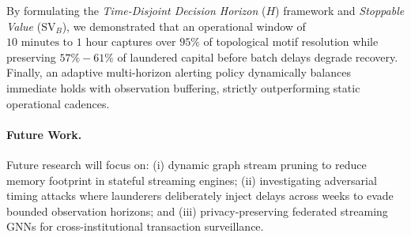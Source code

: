 \documentclass[pdflatex,sn-mathphys,Numbered]{sn-jnl}
\theoremstyle{thmstyleone}
\theoremstyle{thmstyletwo}
\theoremstyle{thmstylethree}
\begin{document}
By formulating the \emph{Time-Disjoint Decision Horizon} ($H$) framework and \emph{Stoppable Value} ($\text{SV}_B$), we demonstrated that an operational window of $10\text{ minutes to } 1\text{ hour}$ captures over $95\%$ of topological motif resolution while preserving $57\% - 61\%$ of laundered capital before batch delays degrade recovery. Finally, an adaptive multi-horizon alerting policy dynamically balances immediate holds with observation buffering, strictly outperforming static operational cadences.

\paragraph{Future Work.} Future research will focus on: (i) dynamic graph stream pruning to reduce memory footprint in stateful streaming engines; (ii) investigating adversarial timing attacks where launderers deliberately inject delays across weeks to evade bounded observation horizons; and (iii) privacy-preserving federated streaming GNNs for cross-institutional transaction surveillance.

\backmatter
\end{document}
